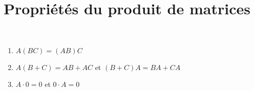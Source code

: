 
%  




\section{Propriétés du produit de matrices}

\begin{frame}

\begin{proposition} \ 
\begin{enumerate}\setlength{\itemsep}{10pt}
  \item $A (BC) = (AB) C$ %

  \item\pause $A(B+C) = AB + AC$ \quad et \quad  $(B+C) A = BA + CA$ %
 
  \item\pause $A\cdot 0 = 0$ \quad et \quad $0\cdot A= 0$
  \vspace*{2ex}
\end{enumerate}
\end{proposition}
 
 
\end{frame}

